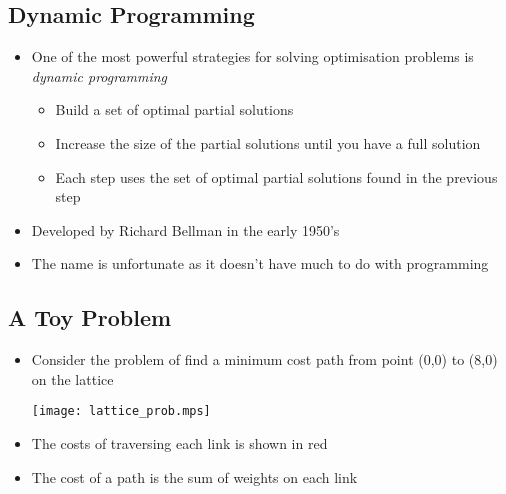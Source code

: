 \begin{slide}
\section{Dynamic Programming}

\begin{PauseHighLight}
  \begin{itemize}
  \item One of the most powerful strategies for solving optimisation
    problems is \emph{dynamic programming}\pause
    \begin{itemize}\squeeze
    \item Build a set of optimal partial solutions\pause
    \item Increase the size of the partial solutions until you have a
      full solution\pause
    \item Each step uses the set of optimal partial solutions found in
      the previous step\pause
    \end{itemize}
  \item Developed by Richard Bellman in the early 1950's\pause
  \item The name is unfortunate as it doesn't have much to do with
    programming\pause 
  \end{itemize}
\end{PauseHighLight}

\end{slide}


\begin{slide}
\section[-2]{A Toy Problem}

\begin{PauseHighLight}
  \begin{itemize}
  \item Consider the problem of find a minimum cost path from point
    (0,0) to (8,0) on the lattice\pause
    \begin{center}\color{TextColor}
      \texttt{[image: lattice\_prob.mps]}
    \end{center}\color{TwoColor}
  \item The costs of traversing each link is shown in red\pause
  \item The cost of a path is the sum of weights on each link\pause
  \end{itemize}
\end{PauseHighLight}

\end{slide}

